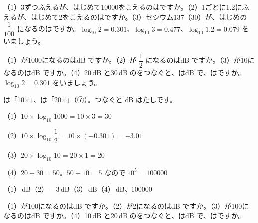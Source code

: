 \begin{jibun}
（1）3ずつふえるが、はじめて10000をこえるのはですか。（2）1ごとに1.2にふえるが、はじめて2をこえるのはですか。（3）セシウム137（30）が、はじめの $\dfrac{1}{100}$ になるのはですか。$\log_{10}2=0.301$、$\log_{10}3=0.477$、$\log_{10}1.2=0.079$ をいましょう。
\end{jibun}

\begin{reidai}[デシベル]
（1）が1000になるのはdB ですか。（2）が $\dfrac{1}{2}$ になるのはdB ですか。（3）が10になるのはdB ですか。（4）20\,dB と30\,dB のをつなぐと、はdB で、はですか。$\log_{10}2=0.301$ をいましょう。\par
\kangaekata {}は「10×」、は「20×」（⑦）。つなぐと dB はたしです。\par
\shiki（1）\nobreak $10\times\log_{10}1000=10\times3=30$\par
\hspace*{2.6\zw}（2）\nobreak $10\times\log_{10}\dfrac{1}{2}=10\times(-0.301)=-3.01$\par
\hspace*{2.6\zw}（3）\nobreak $20\times\log_{10}10=20\times1=20$\par
\hspace*{2.6\zw}（4）\nobreak $20+30=50$。$50\div10=5$ なので $10^5=100000$\par
\kotae（1）\,dB\quad（2）\nobreak {} $-3$\,dB\quad（3）\,dB\quad（4）\,dB、100000
\end{reidai}

\begin{jibun}
（1）が100になるのはdB ですか。（2）が2になるのはdB ですか。（3）が100になるのはdB ですか。（4）10\,dB と20\,dB のをつなぐと、はdB で、はですか。
\end{jibun}

